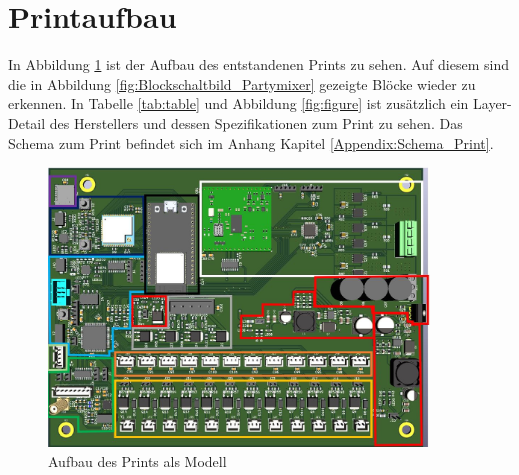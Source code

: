 \newpage
\section{Printaufbau}
\label{sec:Printaufbau}

In Abbildung \ref{fig:Print_3D} ist der Aufbau des entstandenen Prints zu sehen. Auf diesem sind die in Abbildung  \ref{fig:Blockschaltbild_Partymixer} gezeigte Blöcke wieder zu erkennen. In Tabelle \ref{tab:table} und Abbildung \ref{fig:figure} ist zusätzlich ein Layer-Detail des Herstellers und dessen Spezifikationen zum Print zu sehen. Das Schema zum Print befindet sich im Anhang Kapitel \ref{Appendix:Schema_Print}.

\begin{figure}[H]
	\centering
	\includegraphics[width=0.9\textwidth]{graphics/Printteile}
	\caption{Aufbau des Prints als Modell}
	\label{fig:Print_3D}
\end{figure} 

